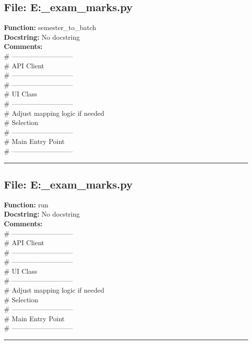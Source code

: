 {\subsection*{File: E:\project\capstone\frontend\faculty\mst_exam_marks.py}
\textbf{Function:} semester_to_batch\\
\textbf{Docstring:} No docstring\\
\textbf{Comments:}\\
# ---------------------------\\
# API Client\\
# ---------------------------\\
# ---------------------------\\
# UI Class\\
# ---------------------------\\
# Adjust mapping logic if needed\\
# Selection\\
# ---------------------------\\
# Main Entry Point\\
# ---------------------------\\

\hrule

\subsection*{File: E:\project\capstone\frontend\faculty\mst_exam_marks.py}
\textbf{Function:} run\\
\textbf{Docstring:} No docstring\\
\textbf{Comments:}\\
# ---------------------------\\
# API Client\\
# ---------------------------\\
# ---------------------------\\
# UI Class\\
# ---------------------------\\
# Adjust mapping logic if needed\\
# Selection\\
# ---------------------------\\
# Main Entry Point\\
# ---------------------------\\

\hrule

}

